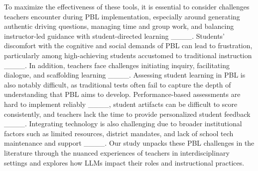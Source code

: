 To maximize the effectiveness of these tools, it is essential to consider challenges teachers encounter during PBL implementation, especially around generating authentic driving questions, 
managing time and group work, and balancing instructor-led guidance with student-directed learning ____. 
Students’ discomfort with the cognitive and social demands of PBL can lead to frustration, particularly among high-achieving students accustomed to traditional instruction ____. In addition, teachers face challenges initiating inquiry, facilitating dialogue, and scaffolding learning ____. 
Assessing student learning in PBL is also notably difficult, as traditional tests often fail to capture the depth of understanding that PBL aims to develop.  %
Performance-based assessments are hard to implement reliably ____, student artifacts can be difficult to score consistently, and teachers lack the time to provide personalized student feedback ____. %
Integrating technology is also challenging due to broader institutional factors such as limited resources, district mandates, and lack of school tech maintenance and support ____. Our study unpacks these PBL challenges in the literature through the nuanced experiences of teachers in interdisciplinary settings and explores how LLMs impact their roles and instructional practices. 



